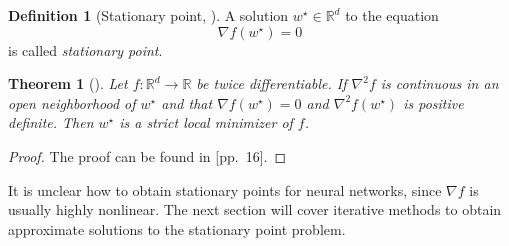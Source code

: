 \documentclass[12pt]{article}
\newtheorem{theorem}{Theorem}[section]
\theoremstyle{definition}
\newtheorem{definition}[definition]{Definition}
\numberwithin{equation}{section}
\newcommand{\R}{\mathbb{R}}
\begin{document}
\begin{definition}[Stationary point, ]
  A solution $w^\star \in \mathbb{R}^d$ to the equation
  \begin{equation}
  \label{eq:StationaryPoint}
    \nabla f(w^\star) = 0
  \end{equation}
  is called \emph{stationary point}.
\end{definition}
\begin{theorem}[]
  Let $f:\R^d \rightarrow \R$ be twice differentiable. If $\nabla^2 f$ is continuous in an open neighborhood of $w^\star$ and that $\nabla f(w^\star) = 0$ and $\nabla^2f(w^\star)$ is positive definite. Then $w^\star$ is a strict local minimizer of $f$.
\end{theorem}
\begin{proof}
  The proof can be found in \cite{nocedalNumericalOptimization2006}[pp.~16].
\end{proof}
It is unclear how to obtain stationary points for neural networks, since $\nabla f$ is usually highly nonlinear. The next section will cover iterative methods to obtain approximate solutions to the stationary point problem.
\end{document}
